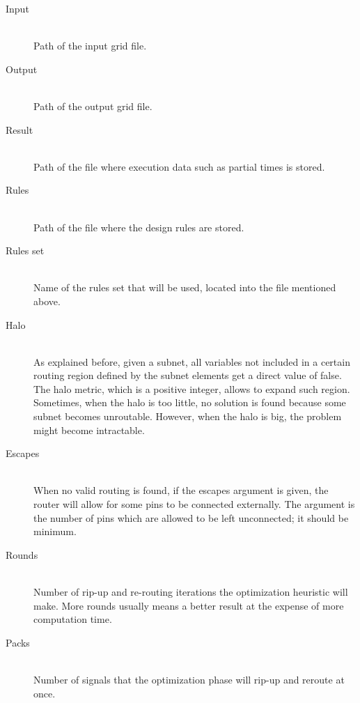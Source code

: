\begin{description}
  \item[Input] \hfill \\
  Path of the input grid file.
  \item[Output] \hfill \\
  Path of the output grid file.
  \item[Result] \hfill \\
  Path of the file where execution data such as partial times is stored.
  \item[Rules] \hfill \\
  Path of the file where the design rules are stored.
  \item[Rules set] \hfill \\
  Name of the rules set that will be used, located into the file mentioned above.
  \item[Halo] \hfill \\
  As explained before, given a subnet, all variables not included in a certain routing region defined by the subnet elements get a direct value of false. The halo metric, which is a positive integer, allows to expand such region. Sometimes, when the halo is too little, no solution is found because some subnet becomes unroutable. However, when the halo is big, the problem might become intractable.
  \item[Escapes] \hfill \\
  When no valid routing is found, if the escapes argument is given, the router will allow for some pins to be connected externally. The argument is the number of pins which are allowed to be left unconnected; it should be minimum.
  \item[Rounds] \hfill \\
  Number of rip-up and re-routing iterations the optimization heuristic will make. More rounds usually means a better result at the expense of more computation time.
  \item[Packs] \hfill \\
  Number of signals that the optimization phase will rip-up and reroute at once.
\end{description}

  